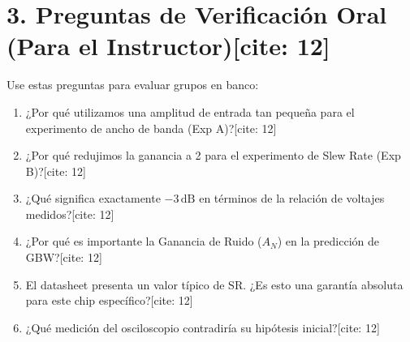 \documentclass[11pt, a4paper]{article}
\begin{document}
\section*{3. Preguntas de Verificación Oral (Para el Instructor)[cite: 12]}
Use estas preguntas para evaluar grupos en banco:
\begin{enumerate}
    \setlength{\itemsep}{0pt}
    \item ¿Por qué utilizamos una amplitud de entrada tan pequeña para el experimento de ancho de banda (Exp A)?[cite: 12]
    \item ¿Por qué redujimos la ganancia a 2 para el experimento de Slew Rate (Exp B)?[cite: 12]
    \item ¿Qué significa exactamente $-3\,\text{dB}$ en términos de la relación de voltajes medidos?[cite: 12]
    \item ¿Por qué es importante la Ganancia de Ruido ($A_N$) en la predicción de GBW?[cite: 12]
    \item El datasheet presenta un valor típico de SR. ¿Es esto una garantía absoluta para este chip específico?[cite: 12]
    \item ¿Qué medición del osciloscopio contradiría su hipótesis inicial?[cite: 12]
\end{enumerate}
\end{document}
